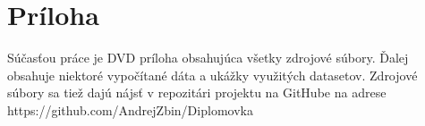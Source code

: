 \chapter{Príloha}
Súčasťou práce je DVD príloha obsahujúca všetky zdrojové súbory.
Ďalej obsahuje niektoré vypočítané dáta a ukážky využitých datasetov.
Zdrojové súbory sa tiež dajú nájsť v repozitári projektu na GitHube na adrese https://github.com/AndrejZbin/Diplomovka